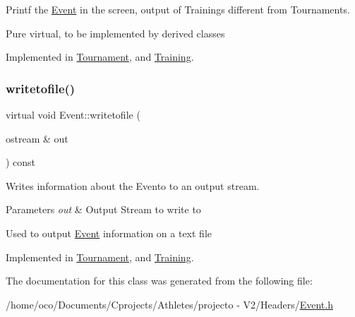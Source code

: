 Printf the \hyperlink{class_event}{Event} in the screen, output of Trainings different from Tournaments. 

Pure virtual, to be implemented by derived classes 

Implemented in \hyperlink{class_tournament_a35bd5292194edb5d5c220838b68cda75}{Tournament}, and \hyperlink{class_training_a9391fa1f4862855341d6243e75f9efef}{Training}.

\hypertarget{class_event_a0c263fb7398dc2f0969a2bb22b47a40a}{}\label{class_event_a0c263fb7398dc2f0969a2bb22b47a40a} 
\subsubsection{\texorpdfstring{writetofile()}{writetofile()}}
{\footnotesize\ttfamily virtual void Event\+::writetofile (\begin{DoxyParamCaption}\item[{ostream \&}]{out }\end{DoxyParamCaption}) const\hspace{0.3cm}{\ttfamily [pure virtual]}}



Writes information about the Evento to an output stream. 


\begin{DoxyParams}{Parameters}
{\em out} & Output Stream to write to\\
\hline
\end{DoxyParams}
Used to output \hyperlink{class_event}{Event} information on a text file 

Implemented in \hyperlink{class_tournament_a4aa375c287d890b9117a91058dcffb0c}{Tournament}, and \hyperlink{class_training_a1755abc9faafbe06fb2825cb5f879016}{Training}.



The documentation for this class was generated from the following file\+:\begin{DoxyCompactItemize}
\item 
/home/oco/\+Documents/\+Cprojects/\+Athletes/projecto -\/ V2/\+Headers/\hyperlink{_event_8h}{Event.\+h}\end{DoxyCompactItemize}
